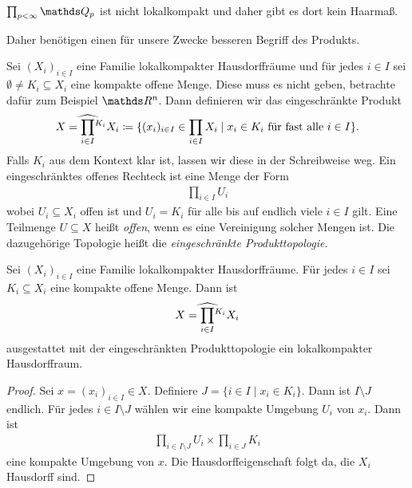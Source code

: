 \begin{bsp}
$\prod_{p <\infty} \Q_p$ ist nicht lokalkompakt und daher gibt es dort kein Haarmaß.
\end{bsp} 

Daher benötigen einen für unsere Zwecke besseren Begriff des Produkts.

\begin{defi}
Sei $(X_i)_{ i \in I}$ eine Familie lokalkompakter Hausdorffräume und für jedes $i \in I$ sei $\emptyset \not =K_i\subseteq X_i$ eine kompakte offene Menge.
Diese muss es nicht geben, betrachte dafür zum Beispiel $\Rn$.
Dann definieren wir das eingeschränkte Produkt
\begin{align*}
X=\widehat{\prod_{i \in I}}\vphantom{\prod}^{K_i} X_i \coloneqq \{(x_i)_{i \in I} \in \prod_{i \in I} X_i \mid x_i \in K_i \text{ für fast alle } i \in I\}.
\end{align*}
Falls $K_i$ aus dem Kontext klar ist, lassen wir diese in der Schreibweise weg.
Ein eingeschränktes offenes Rechteck ist eine Menge der Form
\begin{align*}
\prod_{i\in I} U_i
\end{align*}
wobei $U_i \subseteq X_i$ offen ist und $U_i=K_i$ für alle bis auf endlich viele $i  \in I$ gilt.
Eine Teilmenge $U\subseteq X$ heißt \emph{offen}, wenn es eine Vereinigung solcher Mengen ist.
Die dazugehörige Topologie heißt die \emph{eingeschränkte Produkttopologie}.
\end{defi}

\begin{prop}
Sei $(X_i)_{i\in I}$ eine Familie lokalkompakter Hausdorffräume.
Für jedes $i \in I$ sei $K_i\subseteq X_i$ eine kompakte offene Menge.
Dann ist
\begin{align*}
X=\widehat{\prod_{i \in I}}\vphantom{\prod}^{K_i} X_i
\end{align*}
ausgestattet mit der eingeschränkten Produkttopologie ein lokalkompakter Hausdorffraum.
\end{prop}

\begin{proof}
Sei $x=(x_i)_{i \in I} \in X$. Definiere $J=\{i \in I \mid x_i \in K_i\}$. Dann ist $I\setminus J$ endlich. Für jedes $i \in I\setminus J$ wählen wir eine kompakte Umgebung $U_i$ von $x_i$.
Dann ist
\begin{align*}
\prod_{i\in I\setminus J} U_i \times \prod_{i\in J} K_i
\end{align*}
eine kompakte Umgebung von $x$.
Die Hausdorffeigenschaft folgt da, die $X_i$ Hausdorff sind.
\end{proof}

